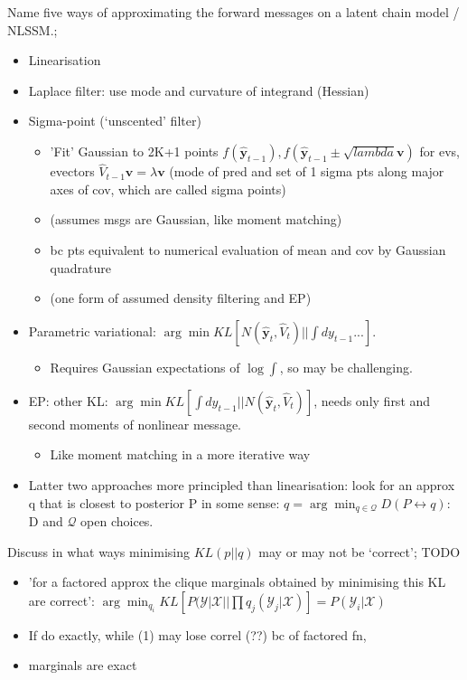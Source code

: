 \documentclass{article}
\begin{document}
Name five ways of approximating the forward messages on a latent chain model / NLSSM.; \begin{itemize} \item Linearisation \item Laplace filter: use mode and curvature of integrand (Hessian) \item Sigma-point (`unscented' filter) \begin{itemize} \item 'Fit' Gaussian to 2K+1 points $f(\hat{\mathbf{y}}_{t-1}), f(\hat{\mathbf{y}}_{t-1}\pm \sqrt{lambda}\mathbf{v})$ for evs, evectors $\hat{V}_{t-1}\mathbf{v}=\lambda\mathbf{v}$ (mode of pred and set of 1 sigma pts along major axes of cov, which are called sigma points) \item (assumes msgs are Gaussian, like moment matching) \item bc pts equivalent to numerical evaluation of mean and cov by Gaussian quadrature \item (one form of assumed density filtering and EP) \end{itemize} \item Parametric variational: $\arg\min KL [N(\mathbf{\hat{y}}_t, \hat{V}_t)||\int dy_{t-1}...]$. \begin{itemize} \item Requires Gaussian expectations of $\log \int$, so may be challenging. \end{itemize} \item EP: other KL: $\arg\min KL[\int  dy_{t-1} ||N(\hat{\mathbf{y}}_t, \hat{V}_t)]$, needs only first and second moments of nonlinear message. \begin{itemize} \item Like moment matching in a more iterative way \end{itemize} \item Latter two approaches more principled than linearisation: look for an approx q that is closest to posterior P in some sense: $q=\arg\min_{q\in\mathcal{Q}}D(P\leftrightarrow q)$: D and $\mathcal{Q}$ open choices. \end{itemize}

Discuss in what ways minimising $KL(p||q)$ may or may not be `correct'; TODO \begin{itemize} \item 'for a factored approx the clique marginals obtained by minimising this KL are correct': $\arg\min_{q_i} KL[P(\mathcal{Y}|\mathcal{X}||\prod q_j(\mathcal{Y}_j|\mathcal{X})]=P(\mathcal{Y}_i|\mathcal{X})$ \item If do exactly, while (1) may lose correl (??) bc of factored fn, \item marginals are exact \end{itemize} 
\end{document}
